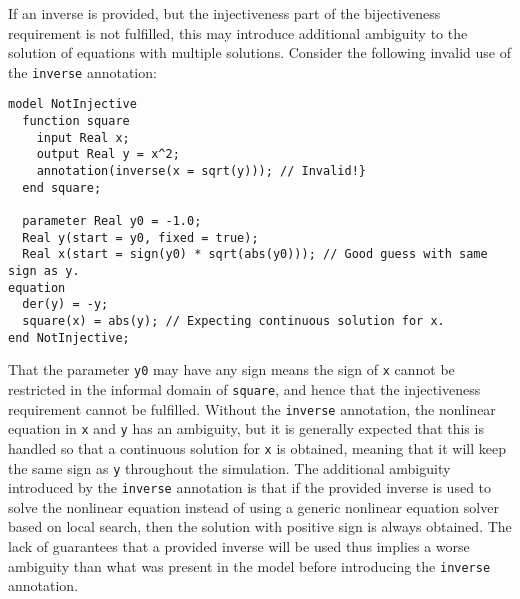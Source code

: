 \begin{example}
If an inverse is provided, but the injectiveness part of the bijectiveness requirement is not fulfilled, this may introduce additional ambiguity to the solution of equations with multiple solutions.
Consider the following invalid use of the {\lstinline!inverse!} annotation:
\begin{lstlisting}[language=modelica]
model NotInjective
  function square
    input Real x;
    output Real y = x^2;
    annotation(inverse(x = sqrt(y))); // Invalid!}
  end square;

  parameter Real y0 = -1.0;
  Real y(start = y0, fixed = true);
  Real x(start = sign(y0) * sqrt(abs(y0))); // Good guess with same sign as y.
equation
  der(y) = -y;
  square(x) = abs(y); // Expecting continuous solution for x.
end NotInjective;
\end{lstlisting}
That the parameter {\lstinline!y0!} may have any sign means the sign of {\lstinline!x!} cannot be restricted in the informal domain of {\lstinline!square!}, and hence that the injectiveness requirement cannot be fulfilled.
Without the {\lstinline!inverse!} annotation, the nonlinear equation in {\lstinline!x!} and {\lstinline!y!} has an ambiguity, but it is generally expected that this is handled so that a continuous solution for {\lstinline!x!} is obtained, meaning that it will keep the same sign as {\lstinline!y!} throughout the simulation.
The additional ambiguity introduced by the {\lstinline!inverse!} annotation is that if the provided inverse is used to solve the nonlinear equation instead of using a generic nonlinear equation solver based on local search, then the solution with positive sign is always obtained.
The lack of guarantees that a provided inverse will be used thus implies a worse ambiguity than what was present in the model before introducing the {\lstinline!inverse!} annotation.
\end{example}

